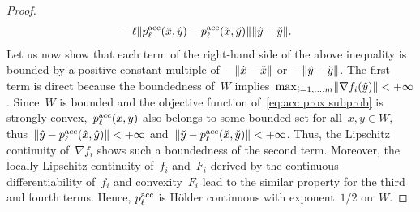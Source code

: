 \documentclass[../main]{subfiles}
\begin{document}
\begin{proof}
\begin{align}
              &- \ell \lVert p^{\mathrm{acc}}_\ell(\hat{x}, \hat{y}) - p^{\mathrm{acc}}_\ell(\check{x}, \check{y})\rVert \lVert\hat{y} - \check{y}\rVert
    .\end{align}
    Let us now show that each term of the right-hand side of the above inequality is bounded by a positive constant multiple of~$- \lVert\hat{x} - \check{x}\rVert$ or~$- \lVert\hat{y} - \check{y}\rVert$.
    The first term is direct because the boundedness of~$W$ implies~$\max_{i = 1, \dots, m} \lVert\nabla f_i(\hat{y})\rVert < + \infty$.
    Since~$W$ is bounded and the objective function of~\cref{eq:acc prox subprob} is strongly convex,~$p^{\mathrm{acc}}_\ell(x, y)$ also belongs to some bounded set for all~$x, y \in W$, thus~$\lVert\hat{y} - p^{\mathrm{acc}}_\ell(\hat{x}, \hat{y})\rVert < + \infty$ and~$\lVert\check{y} - p^{\mathrm{acc}}_\ell(\check{x}, \check{y})\rVert < + \infty$.
    Thus, the Lipschitz continuity of~$\nabla f_i$ shows such a boundedness of the second term.
    Moreover, the locally Lipschitz continuity of~$f_i$ and~$F_i$ derived by the continuous differentiability of~$f_i$ and convexity~$F_i$ lead to the similar property for the third and fourth terms.
    Hence, $p^{\mathrm{acc}}_\ell$ is H\"{o}lder continuous with exponent~$1 / 2$ on~$W$.


\end{proof}
\end{document}
